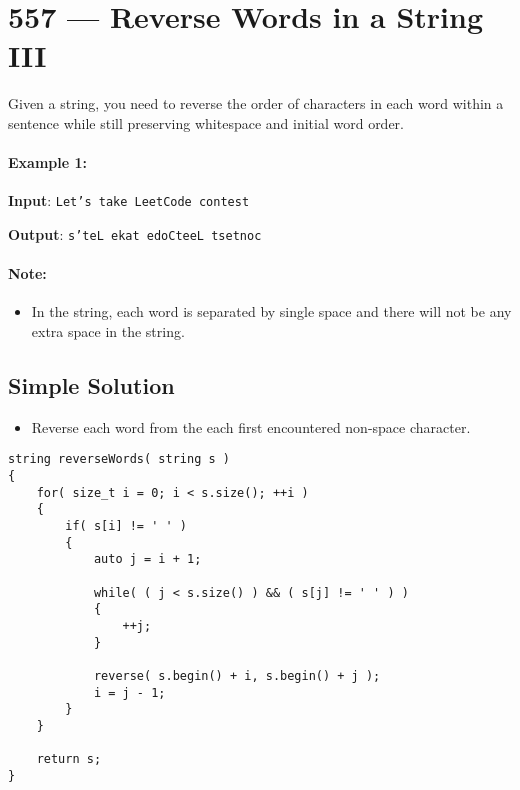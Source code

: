 \section{557 --- Reverse Words in a String III}
Given a string, you need to reverse the order of characters in each word within a sentence while still preserving whitespace and initial word order.

\paragraph{Example 1:}

\begin{flushleft}
\textbf{Input}: \texttt{Let's take LeetCode contest}

\textbf{Output}: \texttt{s'teL ekat edoCteeL tsetnoc}
\end{flushleft}

\paragraph{Note:} 
\begin{itemize}
\item In the string, each word is separated by single space and there will not be any extra space in the string. 
\end{itemize}

\subsection{Simple Solution}
\begin{itemize}
\item Reverse each word from the each first encountered non-space character.
\end{itemize}

\setcounter{lstlisting}{0}
\begin{lstlisting}[style=customc, caption={Simple Solution}]
string reverseWords( string s )
{
    for( size_t i = 0; i < s.size(); ++i )
    {
        if( s[i] != ' ' )
        {
            auto j = i + 1;

            while( ( j < s.size() ) && ( s[j] != ' ' ) )
            {
                ++j;
            }

            reverse( s.begin() + i, s.begin() + j );
            i = j - 1;
        }
    }

    return s;
}
\end{lstlisting}